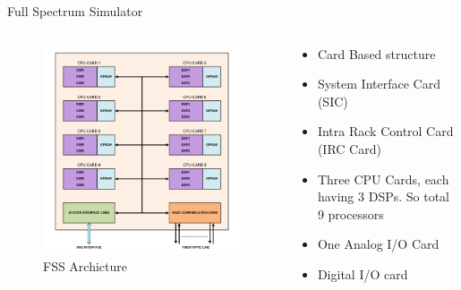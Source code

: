 \documentclass{beamer}
\begin{document}
\begin{frame}{Full Spectrum Simulator}
\begin{columns}
\begin{column}{0.5\textwidth}
\begin{figure}
\includegraphics[width=\columnwidth]{fig/FSS_arch.png}
\caption{FSS Archicture}
\end{figure}
\end{column}
\begin{column}{0.5\textwidth}
\begin{itemize}
\item Card Based structure
\item System Interface Card (SIC)
\item Intra Rack Control Card (IRC Card)
\item Three CPU Cards, each having 3 DSPs. So total 9 processors
\item One Analog I/O Card
\item Digital I/O card 
\end{itemize}
\end{column}
\end{columns}
\end{frame}   
\end{document}
